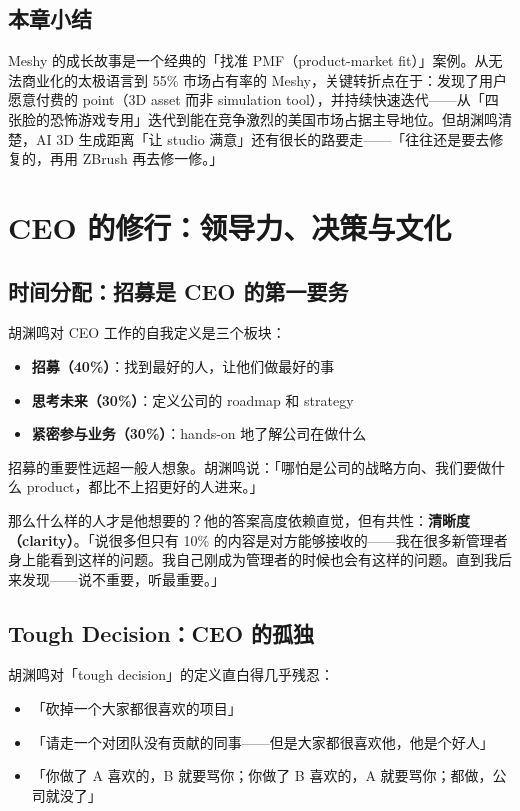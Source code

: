 \documentclass[a4paper]{article}
\begin{document}
\subsection{本章小结}
Meshy 的成长故事是一个经典的「找准 PMF（product-market fit）」案例。从无法商业化的太极语言到 55\% 市场占有率的 Meshy，关键转折点在于：发现了用户愿意付费的 point（3D asset 而非 simulation tool），并持续快速迭代——从「四张脸的恐怖游戏专用」迭代到能在竞争激烈的美国市场占据主导地位。但胡渊鸣清楚，AI 3D 生成距离「让 studio 满意」还有很长的路要走——「往往还是要去修复的，再用 ZBrush 再去修一修。」

\section{CEO 的修行：领导力、决策与文化}

\subsection{时间分配：招募是 CEO 的第一要务}

胡渊鸣对 CEO 工作的自我定义是三个板块：

\begin{itemize}
    \item \textbf{招募（40\%）}：找到最好的人，让他们做最好的事
    \item \textbf{思考未来（30\%）}：定义公司的 roadmap 和 strategy
    \item \textbf{紧密参与业务（30\%）}：hands-on 地了解公司在做什么
\end{itemize}

招募的重要性远超一般人想象。胡渊鸣说：「哪怕是公司的战略方向、我们要做什么 product，都比不上招更好的人进来。」

那么什么样的人才是他想要的？他的答案高度依赖直觉，但有共性：\textbf{清晰度（clarity）}。「说很多但只有 10\% 的内容是对方能够接收的——我在很多新管理者身上能看到这样的问题。我自己刚成为管理者的时候也会有这样的问题。直到我后来发现——说不重要，听最重要。」

\subsection{Tough Decision：CEO 的孤独}

胡渊鸣对「tough decision」的定义直白得几乎残忍：

\begin{itemize}
    \item 「砍掉一个大家都很喜欢的项目」
    \item 「请走一个对团队没有贡献的同事——但是大家都很喜欢他，他是个好人」
    \item 「你做了 A 喜欢的，B 就要骂你；你做了 B 喜欢的，A 就要骂你；都做，公司就没了」
\end{itemize}
\end{document}
